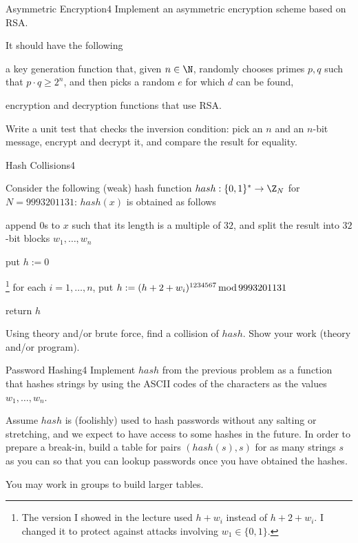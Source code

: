 \documentclass[a4paper]{article}
\begin{document}
\header

\begin{problem}{Asymmetric Encryption}{4}
Implement an asymmetric encryption scheme based on RSA.

It should have the following
\begin{compactitem}
 \item a key generation function that, given $n\in \N$, randomly chooses primes $p,q$ such that $p\cdot q\geq 2^n$, and then picks a random $e$ for which $d$ can be found,
 \item encryption and decryption functions that use RSA.
\end{compactitem}

Write a unit test that checks the inversion condition: pick an $n$ and an $n$-bit message, encrypt and decrypt it, and compare the result for equality.
\end{problem}

\begin{problem}{Hash Collisions}{4}

Consider the following (weak) hash function $hash:\{0,1\}^*\to \Z_N$ for $N=9993201131$: $hash(x)$ is obtained as follows
\begin{compactenum}
 \item append $0$s to $x$ such that its length is a multiple of $32$, and split the result into $32$-bit blocks $w_1,\ldots, w_n$
 \item put $h:=0$
 \item\footnote{The version I showed in the lecture used $h+w_i$ instead of $h+2+w_i$. I changed it to protect against attacks involving $w_1\in\{0,1\}$.}
  for each $i=1,\ldots,n$, put $h:=(h+2+w_i)^{1234567}\mathop{\mathrm{mod}} 9993201131$
 \item return $h$
\end{compactenum}

Using theory and/or brute force, find a collision of $hash$.
Show your work (theory and/or program).
\end{problem}

\begin{problem}{Password Hashing}{4}
Implement $hash$ from the previous problem as a function that hashes strings by using the ASCII codes of the characters as the values $w_1,\ldots,w_n$.

Assume $hash$ is (foolishly) used to hash passwords without any salting or stretching, and we expect to have access to some hashes in the future.
In order to prepare a break-in, build a table for pairs $(hash(s),s)$ for as many strings $s$ as you can so that you can lookup passwords once you have obtained the hashes.

You may work in groups to build larger tables.
\end{problem}
\end{document}
